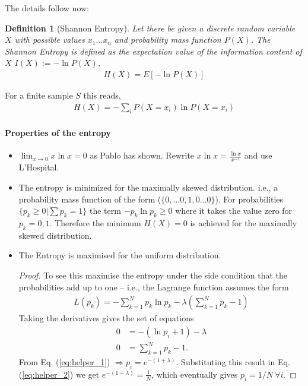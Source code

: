 \documentclass[10pt,a4paper]{article}
\newtheorem{definition}{Definition}
\begin{document}
The details follow now:
\begin{definition}[Shannon Entropy]
Let there be given a discrete random variable $X$ with possible values ${x_1\dots x_n}$ and probability mass function $P(X)$. The Shannon Entropy is defined as the expectation value of the information content of $X$ $I(X):=-\ln P(X)$,
\begin{align}
H(X) = E[-\ln P(X)]
\end{align}
\end{definition}
For a finite sample $S$ this reads,
\begin{align}
H(X) = -\sum_i P (X=x_i) \ln P(X=x_i)
\end{align}

\paragraph*{Properties of the entropy}
\begin{itemize}
\item $\lim _{x \rightarrow 0 }x \ln x = 0 $ as Pablo has shown. Rewrite $x \ln x = \frac{\ln x}{x^{-1}}$ and use L'Hospital. 
\item The entropy is minimized for the maximally skewed distribution. i.e., a probability mass function of the form ($\{0,\dots 0,1,0\dots 0\}$). For probabilities $\{p_k \geq 0 | \sum p_k =1 \}$ the term $-p_k \ln p_k \geq 0$ where it takes the value zero for $p_k = 0,1$. Therefore the minimum $H(X)=0$ is achieved for the maximally skewed distribution.
\item The Entropy is maximised for the uniform distribution. 
\begin{proof}
To see this maximise the entropy under the side condition that the probabilities add up to one -- i.e., the Lagrange function assumes the form
\begin{align}
L(p_k) = -\sum_{k=1}^N p_k \ln p_k -\lambda \left(\sum_{k=1}^N p_k -1 \right)
\end{align} 
Taking the derivatives gives the set of equations
\begin{align}
0 &= - \left( \ln p_i + 1 \right) - \lambda \label{eq:helper_1}\\
0 &= \sum_{k=1}^N p_k -1 \label{eq:helper_2}.
\end{align}
From Eq. (\ref{eq:helper_1}) $\Rightarrow p_i = e^{-(1+\lambda)}$. Substituting this result in Eq. (\ref{eq:helper_2})
we get  $e^{-(1+\lambda)} = \frac{1}{N}$, which eventually gives $p_i = 1/N ~ \forall i$. 
\end{proof}
\end{itemize}
\end{document}

